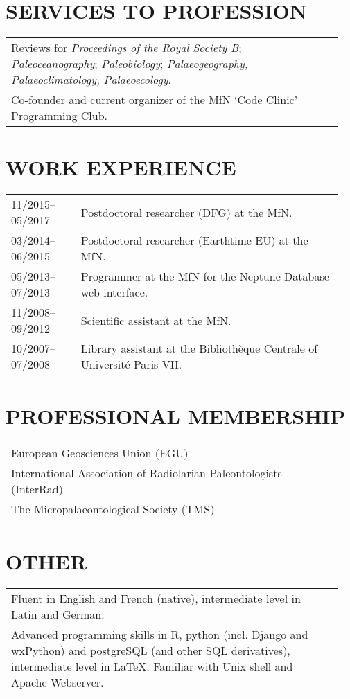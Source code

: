 \documentclass[11pt, a4paper]{article}
\begin{document}
\section{SERVICES TO PROFESSION}
\begin{longtable}{P{0.94\linewidth} p{0.01\linewidth}}
Reviews for \emph{Proceedings of the Royal Society B}; \emph{Paleoceanography}; \emph{Paleobiology}; \emph{Palaeogeography, Palaeoclimatology, Palaeoecology}.& \\
Co-founder and current organizer of the MfN `Code Clinic' Programming Club. & \\
\end{longtable}

\section{WORK EXPERIENCE}
\begin{longtable}{p{0.2\linewidth} P{0.75\linewidth}}
11/2015--05/2017 & Postdoctoral researcher (DFG) at the MfN.\\
03/2014--06/2015 & Postdoctoral researcher (Earthtime-EU) at the MfN.\\
05/2013--07/2013 & Programmer at the MfN for the Neptune Database web interface.\\
11/2008--09/2012 & Scientific assistant at the MfN.\\
10/2007--07/2008 & Library assistant at the Biblioth\`{e}que Centrale of Universit\'{e} Paris VII.\\
\end{longtable}

\section{PROFESSIONAL MEMBERSHIP}
\begin{longtable}{p{0.94\linewidth} p{0.01\linewidth}}
European Geosciences Union (EGU)&\\
International Association of Radiolarian Paleontologists (InterRad)&\\
The Micropalaeontological Society (TMS)&\\
\end{longtable}

\section{OTHER}
\begin{longtable}{P{0.94\linewidth} p{0.01\linewidth}}
Fluent in English and French (native), intermediate level in Latin and German. & \\
Advanced programming skills in R, python (incl. Django and wxPython) and postgreSQL (and other SQL derivatives), intermediate level in \LaTeX. Familiar with Unix shell and Apache Webserver. & \\
\end{longtable}
\end{document}
